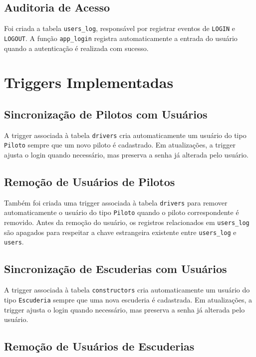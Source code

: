\documentclass[12pt,a4paper]{article}
\begin{document}
\subsection{Auditoria de Acesso}

Foi criada a tabela \texttt{users\_log}, responsável por registrar eventos de \texttt{LOGIN} e \texttt{LOGOUT}. A função \texttt{app\_login} registra automaticamente a entrada do usuário quando a autenticação é realizada com sucesso.

\section{Triggers Implementadas}

\subsection{Sincronização de Pilotos com Usuários}
A trigger associada à tabela \texttt{drivers} cria automaticamente um usuário do tipo \texttt{Piloto} sempre que um novo piloto é cadastrado. Em atualizações, a trigger ajusta o login quando necessário, mas preserva a senha já alterada pelo usuário.

\subsection{Remoção de Usuários de Pilotos}

Também foi criada uma trigger associada à tabela \texttt{drivers} para remover automaticamente o usuário do tipo \texttt{Piloto} quando o piloto correspondente é removido. Antes da remoção do usuário, os registros relacionados em \texttt{users\_log} são apagados para respeitar a chave estrangeira existente entre \texttt{users\_log} e \texttt{users}.

\subsection{Sincronização de Escuderias com Usuários}

A trigger associada à tabela \texttt{constructors} cria automaticamente um usuário do tipo \texttt{Escuderia} sempre que uma nova escuderia é cadastrada. Em atualizações, a trigger ajusta o login quando necessário, mas preserva a senha já alterada pelo usuário.

\subsection{Remoção de Usuários de Escuderias}
\end{document}
